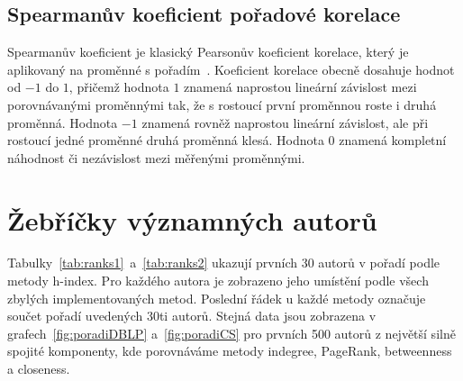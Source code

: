 \documentclass{bakalarka}
\begin{document}
\subsection{Spearmanův koeficient pořadové korelace}
\label{sec:spearman}
Spearmanův koeficient je klasický Pearsonův koeficient korelace, který je
aplikovaný na proměnné s pořadím~\citep{myerswell2002}.  Koeficient korelace
obecně dosahuje hodnot od $-1$ do $1$, přičemž hodnota $1$ znamená naprostou
lineární závislost mezi porovnávanými proměnnými tak, že s rostoucí první
proměnnou roste i druhá proměnná. Hodnota $-1$ znamená rovněž naprostou
lineární závislost, ale při rostoucí jedné proměnné druhá proměnná klesá.
Hodnota $0$ znamená kompletní náhodnost či nezávislost mezi měřenými
proměnnými.



\section{Žebříčky významných autorů}
Tabulky~\ref{tab:ranks1}~a~\ref{tab:ranks2} ukazují prvních 30 autorů v pořadí
podle metody h-index. Pro každého autora je zobrazeno jeho umístění podle všech
zbylých implementovaných metod. Poslední řádek u každé metody označuje součet
pořadí uvedených 30ti autorů. Stejná data jsou zobrazena v
grafech~\ref{fig:poradiDBLP} a~\ref{fig:poradiCS} pro prvních 500 autorů z
největší silně spojité komponenty, kde porovnáváme metody indegree, PageRank,
betweenness a closeness.
\end{document}
